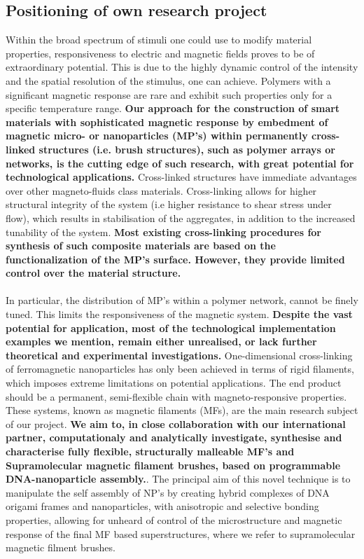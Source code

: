 \documentclass{article}
\begin{document}
\subsection{Positioning of own research project}
Within the broad spectrum of stimuli one could use to modify material properties, responsiveness to electric and magnetic fields proves to be of extraordinary potential.\cite{roy2011biological} This is due to the highly dynamic control of the intensity and the spatial resolution of the stimulus, one can achieve. Polymers with a significant magnetic response are rare and exhibit such properties only for a specific temperature range.\cite{rajca2001magnetic,Kamachi_2002,blundell2004organic} \textbf{Our approach for the construction of smart materials with sophisticated magnetic response by embedment of magnetic micro- or nanoparticles (MP’s) within permanently cross-linked structures (i.e. brush structures), such as polymer arrays or networks, is the cutting edge of such research, with great potential for technological applications.} Cross-linked structures have immediate advantages over other magneto-fluids class materials.\cite{2013,de2011magnetorheological} Cross-linking allows for higher structural integrity of the system (i.e higher resistance to shear stress under flow), which results in stabilisation of the aggregates, in addition to the increased tunability of the system. \textbf{Most existing cross-linking procedures for synthesis of such composite materials are based on the functionalization of the MP’s surface. However, they provide limited control over the material structure.} \\\\
In particular, the distribution of MP’s within a polymer network, cannot be finely tuned. This limits the responsiveness of the magnetic system. \textbf{Despite the vast potential for application, most of the technological implementation examples we mention, remain either unrealised, or lack further theoretical and experimental investigations.} One-dimensional cross-linking of ferromagnetic nanoparticles has only been achieved in terms of rigid filaments, which imposes extreme limitations on potential applications.\cite{zhou2008coating,xiong2007formation,zhang2008fabrication,ma2012fabrication} The end product should be a permanent, semi-flexible chain with magneto-responsive properties. These systems, known as magnetic filaments (MFs), are the main research subject of our project. \textbf{We aim to, in close collaboration with our international partner, computationaly and analytically investigate, synthesise and characterise fully flexible, structurally malleable MF’s and Supramolecular magnetic filament brushes, based on programmable DNA-nanoparticle assembly.}\cite{Maye_2009, Sun_2012, Sun_2013, Zhang_2013, Tian_2015}. The principal aim of this novel technique is to manipulate the self assembly of NP’s by creating hybrid complexes of DNA origami frames and nanoparticles, with anisotropic and selective bonding properties, allowing for unheard of control of the microstructure and magnetic response of the final MF based superstructures, where we refer to supramolecular magnetic filment brushes.
\end{document}
